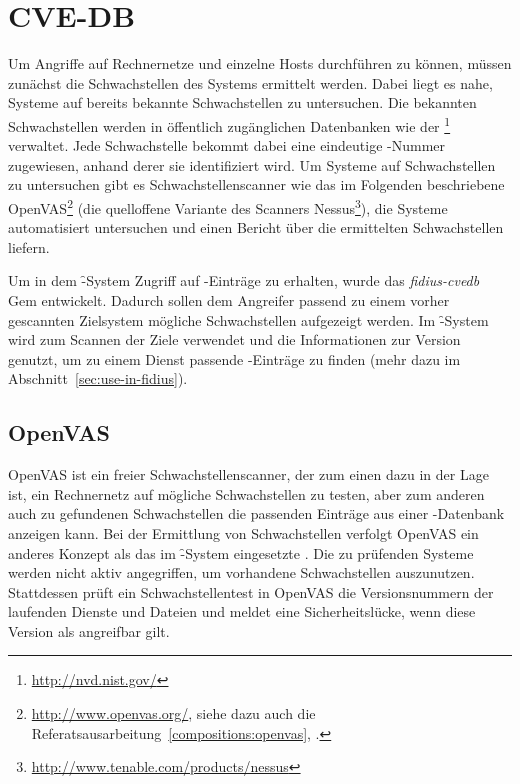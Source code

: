 \section{CVE-DB}
\label{sec:cve-db}
\authors{\AB \and \JF}{\DE \and \LM \and \MW}

Um Angriffe auf Rechnernetze und einzelne Hosts durchführen zu können,
müssen zunächst die Schwachstellen des Systems ermittelt werden. Dabei
liegt es nahe, Systeme auf bereits bekannte Schwachstellen zu
untersuchen. Die bekannten Schwachstellen werden in öffentlich
zugänglichen Datenbanken wie der
\footnote{\url{http://nvd.nist.gov/}} verwaltet. Jede
Schwachstelle bekommt dabei eine eindeutige -Nummer
zugewiesen, anhand derer sie identifiziert wird. Um Systeme auf
Schwachstellen zu untersuchen gibt es Schwachstellenscanner wie das im
Folgenden beschriebene OpenVAS\footnote{\url{http://www.openvas.org/},
siehe dazu auch die Referatsausarbeitung~\ref{compositions:openvas},
.} (die quelloffene Variante des Scanners
Nessus\footnote{\url{http://www.tenable.com/products/nessus}}), die
Systeme automatisiert untersuchen und einen Bericht über die
ermittelten Schwachstellen liefern.

Um in dem \f-System Zugriff auf -Einträge zu erhalten,
wurde das \textit{fidius-cvedb} Gem entwickelt. Dadurch sollen dem
Angreifer passend zu einem vorher gescannten Zielsystem mögliche
Schwachstellen aufgezeigt werden. Im \f-System wird 
zum Scannen der Ziele verwendet und die Informationen zur Version
genutzt, um zu einem Dienst passende -Einträge zu finden (mehr dazu
im Abschnitt~\ref{sec:use-in-fidius}).

\subsection{OpenVAS}
\label{sec:openvas}

OpenVAS ist ein freier Schwachstellenscanner, der zum einen dazu in der Lage
ist, ein Rechnernetz auf mögliche Schwachstellen zu testen, aber zum
anderen auch zu gefundenen Schwachstellen die passenden Einträge aus
einer -Datenbank anzeigen kann.
Bei der Ermittlung von
Schwachstellen verfolgt OpenVAS ein anderes Konzept als das im
\f-System eingesetzte . Die zu prüfenden Systeme werden
nicht aktiv angegriffen, um vorhandene Schwachstellen
auszunutzen. Stattdessen prüft ein Schwachstellentest in OpenVAS die
Versionsnummern der laufenden Dienste und Dateien und meldet eine
Sicherheitslücke, wenn diese Version als angreifbar gilt.

